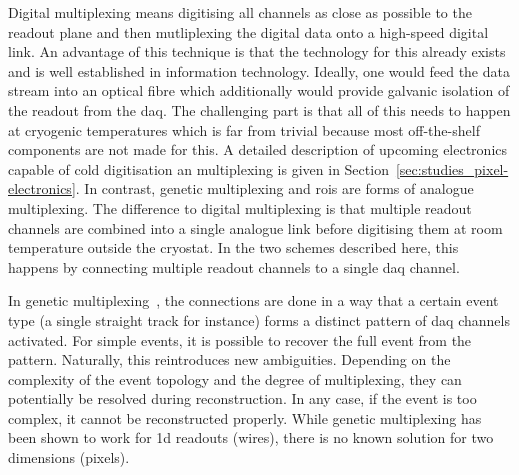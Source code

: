 Digital multiplexing means digitising all channels as close as possible to the readout plane and then mutliplexing the digital data onto a high-speed digital link.
An advantage of this technique is that the technology for this already exists and is well established in information technology.
Ideally, one would feed the data stream into an optical fibre which additionally would provide galvanic isolation of the readout from the \gls{daq}.
The challenging part is that all of this needs to happen at cryogenic temperatures which is far from trivial because most off-the-shelf components are not made for this.
A detailed description of upcoming electronics capable of cold digitisation an multiplexing is given in Section~\ref{sec:studies_pixel-electronics}.
In contrast, genetic multiplexing and \glspl{roi} are forms of analogue multiplexing.
The difference to digital multiplexing is that multiple readout channels are combined into a single analogue link before digitising them at room temperature outside the cryostat.
In the two schemes described here, this happens by connecting multiple readout channels to a single \gls{daq} channel.

In genetic multiplexing~\cite{gen_mux}, the connections are done in a way that a certain event type (a single straight track for instance) forms a distinct pattern of \gls{daq} channels activated.
For simple events, it is possible to recover the full event from the pattern.
Naturally, this reintroduces new ambiguities.
Depending on the complexity of the event topology and the degree of multiplexing, they can potentially be resolved during reconstruction.
In any case, if the event is too complex, it cannot be reconstructed properly.
While genetic multiplexing has been shown to work for \gls{1d} readouts (wires), there is no known solution for two dimensions (pixels).

